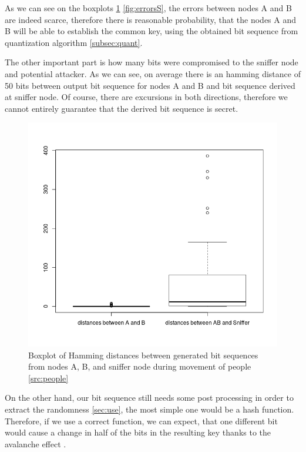 \documentclass[
  print, %
  table,   %
  nolof,     %
  nolot,     %
           oneside
]{fithesis3}
\begin{document}
  As we can see on the boxplots \ref{fig:errorsT} \ref{fig:errorsS}, the errors between nodes A and B are indeed scarce, therefore there is reasonable probability, that the nodes A and B will be able to establish the common key, using the obtained bit sequence from quantization algorithm \ref{subsec:quant}.

  The other important part is how many bits were compromised to the sniffer node and potential attacker. As we can see, on average there is an hamming distance of 50 bits between output bit sequence for nodes A and B and bit sequence derived at sniffer node. Of course, there are excursions in both directions, therefore we cannot entirely guarantee that the derived bit sequence is secret.


  \begin{figure}
    \includegraphics[width=\textwidth]{../images/boxplotDistancesTeaching.png}
  \caption{Boxplot of Hamming distances between generated bit sequences from nodes A, B, and sniffer node during movement of people \ref{src:people}}
  \label{fig:errorsT}
  \end{figure}

On the other hand, our bit sequence still needs some post processing in order to extract the randomness \ref{sec:use}, the most simple one would be a hash function. Therefore, if we use a correct function, we can expect, that one different bit would cause a change in half of the bits in the resulting key thanks to the avalanche effect \cite{Webster1986}.
\end{document}
